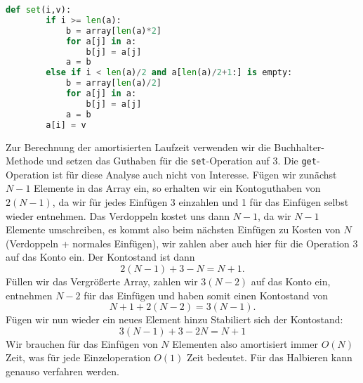 \documentclass[a4paper,10pt]{article}
\begin{document}
\begin{enumerate}
\begin{lstlisting}[language=Python,numbers=none]
    def set(i,v):
        if i >= len(a):
            b = array[len(a)*2]
            for a[j] in a:
                b[j] = a[j]
            a = b
        else if i < len(a)/2 and a[len(a)/2+1:] is empty:
            b = array[len(a)/2]
            for a[j] in a:
                b[j] = a[j]
            a = b
        a[i] = v
        \end{lstlisting}
        Zur Berechnung der amortisierten Laufzeit verwenden wir die Buchhalter-Methode und setzen das Guthaben für die \texttt{set}-Operation auf 3.
        Die \texttt{get}-Operation ist für diese Analyse auch nicht von Interesse.
        Fügen wir zunächst $N-1$ Elemente in das Array ein, so erhalten wir ein Kontoguthaben von $2(N-1)$, da wir für jedes Einfügen 3 einzahlen und 1 für das Einfügen selbst wieder entnehmen. Das Verdoppeln  kostet uns dann $N-1$, da wir $N-1$ Elemente umschreiben, es kommt also beim nächsten Einfügen zu Kosten von $N$ (Verdoppeln + normales Einfügen), wir zahlen aber auch hier für die Operation 3 auf das Konto ein. Der Kontostand ist dann
        \[2(N-1) + 3 - N = N + 1.\]
        Füllen wir das Vergrößerte Array, zahlen wir $3(N-2)$ auf das Konto ein, entnehmen $N-2$ für das Einfügen und haben somit einen Kontostand von
        \[N + 1 + 2(N-2) = 3(N-1).\]
        Fügen wir nun wieder ein neues Element hinzu Stabiliert sich der Kontostand:
        \[3(N-1) + 3 - 2N = N + 1\]
        Wir brauchen für das Einfügen von $N$ Elementen also amortisiert immer $O(N)$ Zeit, was für jede Einzeloperation $O(1)$ Zeit bedeutet.
        Für das Halbieren kann genauso verfahren werden.
\end{enumerate}
\end{document}
